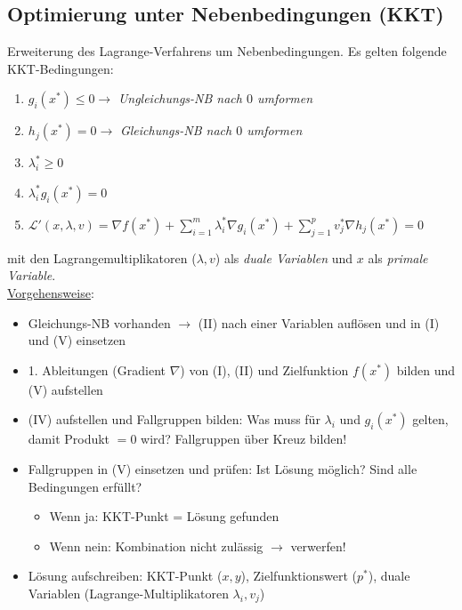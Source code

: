 \subsection{Optimierung unter Nebenbedingungen (KKT)}

Erweiterung des Lagrange-Verfahrens um Nebenbedingungen.
Es gelten folgende KKT-Bedingungen:

\begin{enumerate}[label=(\Roman*)]
    \item \(g_i(x^*)\leq 0 \rightarrow \) \emph{Ungleichungs-NB nach \(0\) umformen}
    \item \(h_j(x^*)=0 \rightarrow\) \emph{Gleichungs-NB nach \(0\) umformen}
    \item \(\lambda_i^*\geq 0\)
    \item \(\lambda_i^*g_i(x^*)=0\)
    \item $\mathcal{L}'(x,\lambda, v) = \nabla f(x^*) + \sum_{i=1}^m \lambda_i^* \nabla g_i(x^*) + \sum_{j=1}^p v_j^* \nabla h_j(x^*) = 0$\\
\end{enumerate}

mit den Lagrangemultiplikatoren ($\lambda, v$) als \emph{duale Variablen} und $x$ als \emph{primale Variable}.\\

\underline{Vorgehensweise}:
\begin{itemize}
    \item Gleichungs-NB vorhanden \(\rightarrow\) (II) nach einer Variablen auflösen und in (I) und (V) einsetzen
    \item 1. Ableitungen (Gradient \(\nabla\)) von (I), (II) und Zielfunktion \(f(x^*)\) bilden und (V) aufstellen
    \item (IV) aufstellen und Fallgruppen bilden: Was muss für \(\lambda_i\) und \(g_i(x^*)\) gelten, damit Produkt \(=0\) wird? Fallgruppen über Kreuz bilden!
    \item Fallgruppen in (V) einsetzen und prüfen: Ist Lösung möglich? Sind alle Bedingungen erfüllt?
    \begin{itemize}
        \item Wenn ja: KKT-Punkt = Lösung gefunden
        \item Wenn nein: Kombination nicht zulässig \(\rightarrow\) verwerfen!\\
    \end{itemize}
    \item Lösung aufschreiben: KKT-Punkt (\(x, y\)), Zielfunktionswert (\(p^*\)), duale Variablen (Lagrange-Multiplikatoren \(\lambda_i, v_j\))\\
\end{itemize}

